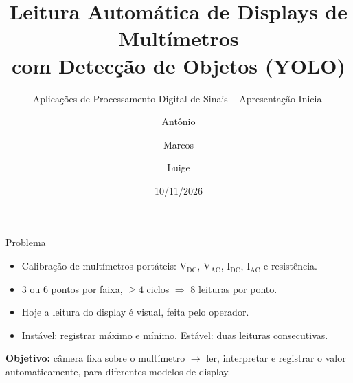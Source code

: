 \documentclass[aspectratio=169,10pt]{beamer}
\title{Leitura Automática de Displays de Multímetros\\com Detecção de Objetos (YOLO)}
\subtitle{Aplicações de Processamento Digital de Sinais -- Apresentação Inicial}
\author{Antônio \and Marcos \and Luige}
\date{10/11/2026}
\begin{document}
\begin{frame}
  \titlepage
\end{frame}

\begin{frame}{Problema}
  \begin{itemize}
    \item Calibração de multímetros portáteis: V$_\text{DC}$, V$_\text{AC}$,
          I$_\text{DC}$, I$_\text{AC}$ e resistência.
    \item 3 ou 6 pontos por faixa, $\geq 4$ ciclos $\Rightarrow$ 8 leituras por ponto.
    \item Hoje a leitura do display é \alert{visual}, feita pelo operador.
    \item Instável: registrar máximo e mínimo. Estável: duas leituras consecutivas.
  \end{itemize}
  \vspace{2mm}
  \textbf{Objetivo:} câmera fixa sobre o multímetro $\rightarrow$ ler, interpretar
  e registrar o valor automaticamente, para diferentes modelos de display.
\end{frame}
\end{document}
